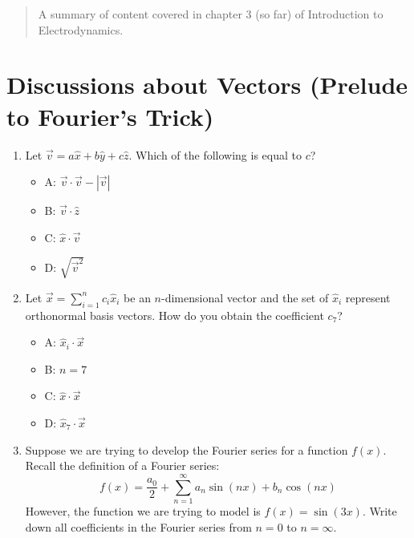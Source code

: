 \documentclass[10pt]{article}
\begin{document}
\maketitle

\begin{abstract}
A summary of content covered in chapter 3 (so far) of Introduction to Electrodynamics. 
\end{abstract}
\noindent

\section{Discussions about Vectors (Prelude to Fourier's Trick)}

\begin{enumerate}
\item Let $\vec{v} = a \hat{x} + b \hat{y} + c \hat{z}$.  Which of the following is equal to $c$?
\begin{itemize}
\item A: $\vec{v} \cdot \vec{v} - |\vec{v}|$
\item B: $\vec{v} \cdot \hat{z}$
\item C: $\hat{x} \cdot \vec{v}$
\item D: $\sqrt{\vec{v}^2}$
\end{itemize}

\item Let $\vec{x} = \sum_{i=1}^n c_i \hat{x}_i$ be an $n$-dimensional vector and the set of $\hat{x}_i$ represent orthonormal basis vectors.  How do you obtain the coefficient $c_7$?
\begin{itemize}
\item A: $\hat{x}_i \cdot \vec{x}$
\item B: $n = 7$
\item C: $\hat{x} \cdot \vec{x}$
\item D: $\hat{x}_7 \cdot \vec{x}$
\end{itemize}

\item Suppose we are trying to develop the Fourier series for a function $f(x)$.  Recall the definition of a Fourier series:
\begin{equation}
f(x) = \frac{a_0}{2} + \sum_{n=1}^{\infty} a_n \sin(nx) + b_n \cos(nx)
\end{equation}
However, the function we are trying to model is $f(x) = \sin(3x)$.  Write down all coefficients in the Fourier series from $n=0$ to $n = \infty$. \\ \vspace{1cm}
\end{enumerate}
\end{document}
